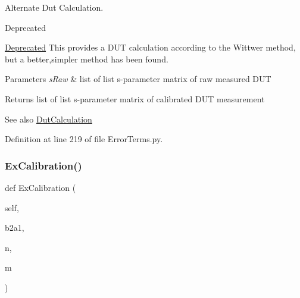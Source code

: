 Alternate Dut Calculation. 

\begin{DoxyRefDesc}{Deprecated}
\item[\hyperlink{deprecated__deprecated000001}{Deprecated}]This provides a D\+UT calculation according to the Wittwer method, but a better,simpler method has been found.\end{DoxyRefDesc}

\begin{DoxyParams}{Parameters}
{\em s\+Raw} & list of list s-\/parameter matrix of raw measured D\+UT \\
\hline
\end{DoxyParams}
\begin{DoxyReturn}{Returns}
list of list s-\/parameter matrix of calibrated D\+UT measurement 
\end{DoxyReturn}
\begin{DoxySeeAlso}{See also}
\hyperlink{classSignalIntegrity_1_1Measurement_1_1Calibration_1_1ErrorTerms_1_1ErrorTerms_ac257ff0d436f9c02507349f82ece9e56}{Dut\+Calculation} 
\end{DoxySeeAlso}


Definition at line 219 of file Error\+Terms.\+py.

\mbox{\label{classSignalIntegrity_1_1Measurement_1_1Calibration_1_1ErrorTerms_1_1ErrorTerms_a7dd89d542be158c0b13f2c0b7f2a852c}} 
\subsubsection{\texorpdfstring{Ex\+Calibration()}{ExCalibration()}}
{\footnotesize\ttfamily def Ex\+Calibration (\begin{DoxyParamCaption}\item[{}]{self,  }\item[{}]{b2a1,  }\item[{}]{n,  }\item[{}]{m }\end{DoxyParamCaption})}



